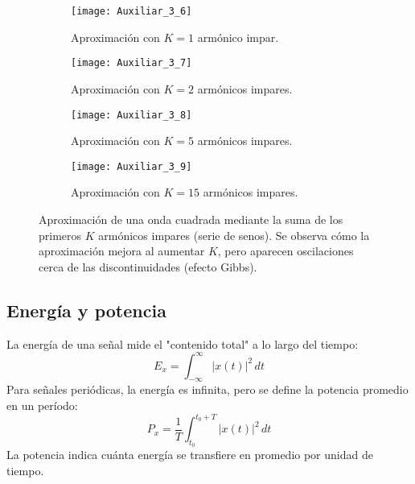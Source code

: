 \documentclass[
  11pt,
  letterpaper,
   addpoints,
   answers
  ]{exam}
\begin{document}
\begin{figure}[H]
  \centering
  \begin{subfigure}[t]{0.48\textwidth}
    \centering
    \texttt{[image: Auxiliar\_3\_6]}
    \caption{Aproximación con $K=1$ armónico impar.}
  \end{subfigure}
  \hfill
  \begin{subfigure}[t]{0.48\textwidth}
    \centering
    \texttt{[image: Auxiliar\_3\_7]}
    \caption{Aproximación con $K=2$ armónicos impares.}
  \end{subfigure}
    
  \begin{subfigure}[t]{0.48\textwidth}
    \centering
    \texttt{[image: Auxiliar\_3\_8]}
    \caption{Aproximación con $K=5$ armónicos impares.}
  \end{subfigure}
  \hfill
  \begin{subfigure}[t]{0.48\textwidth}
    \centering
    \texttt{[image: Auxiliar\_3\_9]}
    \caption{Aproximación con $K=15$ armónicos impares.}
  \end{subfigure}
  \caption{Aproximación de una onda cuadrada mediante la suma de los primeros $K$ armónicos impares (serie de senos). Se observa cómo la aproximación mejora al aumentar $K$, pero aparecen oscilaciones cerca de las discontinuidades (efecto Gibbs).}
  \label{fig:aprox_cuadrada}
\end{figure}

\subsection*{Energía y potencia}
La energía de una señal mide el "contenido total" a lo largo del tiempo:
\begin{equation}
  E_x = \int_{-\infty}^{\infty} |x(t)|^2\,dt
\end{equation}
Para señales periódicas, la energía es infinita, pero se define la potencia promedio en un período:
\begin{equation}
  P_x = \frac{1}{T}\int_{t_0}^{t_0+T} |x(t)|^2\,dt
\end{equation}
La potencia indica cuánta energía se transfiere en promedio por unidad de tiempo.
\end{document}
